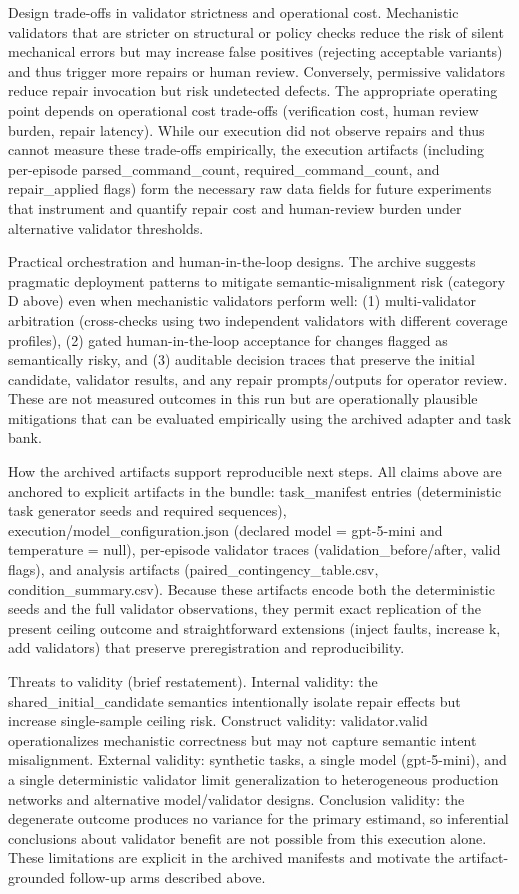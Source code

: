 \documentclass[conference]{IEEEtran}
\begin{document}
Design trade-offs in validator strictness and operational cost. Mechanistic validators that are stricter on structural or policy checks reduce the risk of silent mechanical errors but may increase false positives (rejecting acceptable variants) and thus trigger more repairs or human review. Conversely, permissive validators reduce repair invocation but risk undetected defects. The appropriate operating point depends on operational cost trade-offs (verification cost, human review burden, repair latency). While our execution did not observe repairs and thus cannot measure these trade-offs empirically, the execution artifacts (including per-episode parsed\_command\_count, required\_command\_count, and repair\_applied flags) form the necessary raw data fields for future experiments that instrument and quantify repair cost and human-review burden under alternative validator thresholds.

Practical orchestration and human-in-the-loop designs. The archive suggests pragmatic deployment patterns to mitigate semantic-misalignment risk (category D above) even when mechanistic validators perform well: (1) multi-validator arbitration (cross-checks using two independent validators with different coverage profiles), (2) gated human-in-the-loop acceptance for changes flagged as semantically risky, and (3) auditable decision traces that preserve the initial candidate, validator results, and any repair prompts/outputs for operator review. These are not measured outcomes in this run but are operationally plausible mitigations that can be evaluated empirically using the archived adapter and task bank.

How the archived artifacts support reproducible next steps. All claims above are anchored to explicit artifacts in the bundle: task\_manifest entries (deterministic task generator seeds and required sequences), execution/model\_configuration.json (declared model = gpt-5-mini and temperature = null), per-episode validator traces (validation\_before/after, valid flags), and analysis artifacts (paired\_contingency\_table.csv, condition\_summary.csv). Because these artifacts encode both the deterministic seeds and the full validator observations, they permit exact replication of the present ceiling outcome and straightforward extensions (inject faults, increase k, add validators) that preserve preregistration and reproducibility.

Threats to validity (brief restatement). Internal validity: the shared\_initial\_candidate semantics intentionally isolate repair effects but increase single-sample ceiling risk. Construct validity: validator.valid operationalizes mechanistic correctness but may not capture semantic intent misalignment. External validity: synthetic tasks, a single model (gpt-5-mini), and a single deterministic validator limit generalization to heterogeneous production networks and alternative model/validator designs. Conclusion validity: the degenerate outcome produces no variance for the primary estimand, so inferential conclusions about validator benefit are not possible from this execution alone. These limitations are explicit in the archived manifests and motivate the artifact-grounded follow-up arms described above.
\end{document}
